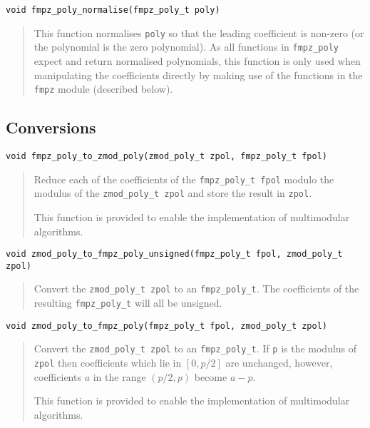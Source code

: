\documentclass[a4paper,10pt]{article}
\newcommand{\code}{\lstinline}
\begin{document}
\begin{lstlisting}
void fmpz_poly_normalise(fmpz_poly_t poly) 
\end{lstlisting}
\begin{quote}
This function normalises \code{poly} so that the leading coefficient is non-zero (or the polynomial is the zero polynomial). As all functions in \code{fmpz_poly} expect and return normalised polynomials, this function is only used when manipulating the coefficients directly by making use of the functions in the \code{fmpz} module (described below).
\end{quote}

\subsection{Conversions}

\begin{lstlisting}
void fmpz_poly_to_zmod_poly(zmod_poly_t zpol, fmpz_poly_t fpol)
\end{lstlisting}
\begin{quote}
Reduce each of the coefficients of the \code{fmpz_poly_t fpol} modulo the modulus of the \code{zmod_poly_t zpol} and store the result in \code{zpol}.

This function is provided to enable the implementation of multimodular algorithms.
\end{quote}

\begin{lstlisting}
void zmod_poly_to_fmpz_poly_unsigned(fmpz_poly_t fpol, zmod_poly_t zpol)\end{lstlisting}
\begin{quote}
Convert the \code{zmod_poly_t zpol} to an \code{fmpz_poly_t}. The coefficients of the resulting \code{fmpz_poly_t} will all be unsigned.
\end{quote}

\begin{lstlisting}
void zmod_poly_to_fmpz_poly(fmpz_poly_t fpol, zmod_poly_t zpol)\end{lstlisting}
\begin{quote}
Convert the \code{zmod_poly_t zpol} to an \code{fmpz_poly_t}. If \code{p} is the modulus of \code{zpol} then coefficients which lie in $[0, p/2]$ are unchanged, however, coefficients $a$ in the range $(p/2, p)$ become $a - p$.

This function is provided to enable the implementation of multimodular algorithms.
\end{quote}
\end{document}
